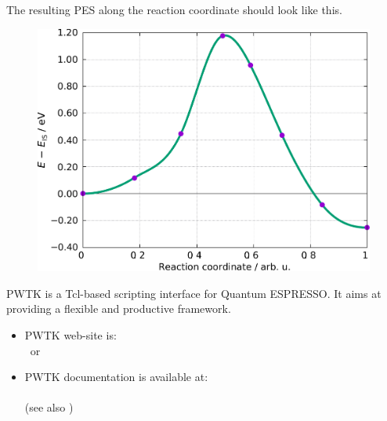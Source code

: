 \documentclass[landscape]{foils}
\begin{document}
\clearpage

\vspace*{1em}
The resulting PES along the reaction coordinate should look like this.

\vspace*{1em}
\begin{figure}
  \centering
    \includegraphics[width=14.cm]{figs/NEB-H2onAl100-results.pdf}
\end{figure}



PWTK is a Tcl-based scripting interface for Quantum ESPRESSO. It aims
at providing a flexible and productive framework.

\begin{itemize}
\item PWTK web-site is:\\
   ~or~ 
\item PWTK documentation is available at:\\
  \\
  (see also )
\end{itemize}
\end{document}
